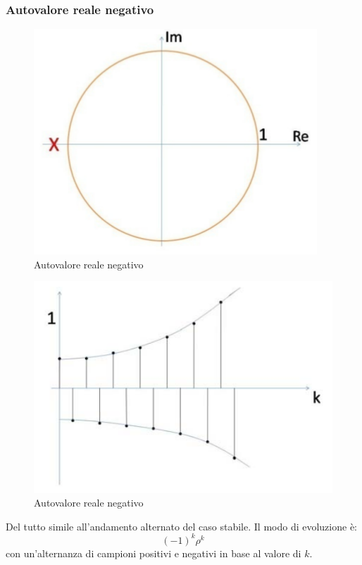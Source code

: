 \documentclass[a4paper]{report}
\begin{document}
\subsubsection{Autovalore reale negativo}
\begin{figure}[!h]
  \begin{center}
    \includegraphics[scale=0.3]{./figures/autovaloreRealeNegativoInstabile00.png}
    \caption{Autovalore reale
      negativo}\label{fig:autovaloreRealeNegativoInstabile00.png} 
  \end{center}
\end{figure}
\begin{figure}[!h]
  \begin{center}
    \includegraphics[scale=0.3]{./figures/autovaloreRealeNegativoInstabile01.png}
    \caption{Autovalore reale
      negativo}\label{fig:autovaloreRealeNegativoInstabile01.png} 
  \end{center}
\end{figure}
Del tutto simile all'andamento alternato del caso stabile. Il modo di
evoluzione \`e:
\[
(-1)^k \rho^k
\]
con un'alternanza di campioni positivi e negativi in base al valore di
$k$.
\end{document}
